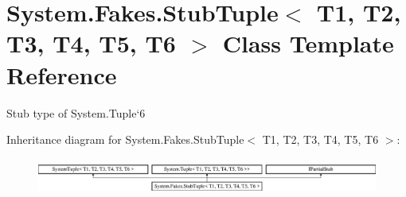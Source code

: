 \hypertarget{class_system_1_1_fakes_1_1_stub_tuple_3_01_t1_00_01_t2_00_01_t3_00_01_t4_00_01_t5_00_01_t6_01_4}{\section{System.\-Fakes.\-Stub\-Tuple$<$ T1, T2, T3, T4, T5, T6 $>$ Class Template Reference}
\label{class_system_1_1_fakes_1_1_stub_tuple_3_01_t1_00_01_t2_00_01_t3_00_01_t4_00_01_t5_00_01_t6_01_4}
}


Stub type of System.\-Tuple`6 


Inheritance diagram for System.\-Fakes.\-Stub\-Tuple$<$ T1, T2, T3, T4, T5, T6 $>$\-:\begin{figure}[H]
\begin{center}
\leavevmode
\includegraphics[height=1.200429cm]{class_system_1_1_fakes_1_1_stub_tuple_3_01_t1_00_01_t2_00_01_t3_00_01_t4_00_01_t5_00_01_t6_01_4}
\end{center}
\end{figure}
